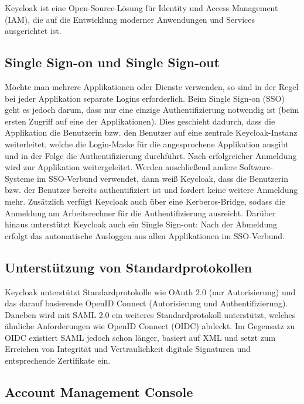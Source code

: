 Keycloak ist eine Open-Source-Lösung für Identity und Access Management (IAM), die auf die Entwicklung moderner Anwendungen und Services ausgerichtet ist.
\cite{sysarch-keycloak-1}

\subsection{Single Sign-on und Single Sign-out}

Möchte man mehrere Applikationen oder Dienste verwenden, so sind in der Regel bei jeder Applikation separate Logins erforderlich. Beim Single Sign-on (SSO) geht es jedoch darum, 
dass nur eine einzige Authentifizierung notwendig ist (beim ersten Zugriff auf eine der Applikationen). Dies geschieht dadurch, dass die Applikation die Benutzerin bzw. 
den Benutzer auf eine zentrale Keycloak-Instanz weiterleitet, welche die Login-Maske für die angesprochene Applikation ausgibt und in der Folge die Authentifizierung durchführt.
Nach erfolgreicher Anmeldung wird zur Applikation weitergeleitet. Werden anschließend andere Software-Systeme im SSO-Verbund verwendet, dann weiß Keycloak, dass die Benutzerin bzw. 
der Benutzer bereits authentifiziert ist und fordert keine weitere Anmeldung mehr. Zusätzlich verfügt Keycloak auch über eine Kerberos-Bridge, sodass die Anmeldung am Arbeitsrechner 
für die Authentifizierung ausreicht. Darüber hinaus unterstützt Keycloak auch ein Single Sign-out: Nach der Abmeldung erfolgt das automatische Ausloggen aus allen Applikationen im SSO-Verbund.
\cite{sysarch-keycloak-2}

\subsection{Unterstützung von Standardprotokollen}

Keycloak unterstützt Standardprotokolle wie OAuth 2.0 (nur Autorisierung) und das darauf basierende OpenID Connect (Autorisierung und Authentifizierung). 
Daneben wird mit SAML 2.0 ein weiteres Standardprotokoll unterstützt, welches ähnliche Anforderungen wie OpenID Connect (OIDC) abdeckt. 
Im Gegensatz zu OIDC existiert SAML jedoch schon länger, basiert auf XML und setzt zum Erreichen von Integrität und Vertraulichkeit digitale Signaturen und entsprechende Zertifikate ein.
\cite{sysarch-keycloak-2}

\subsection{Account Management Console}

